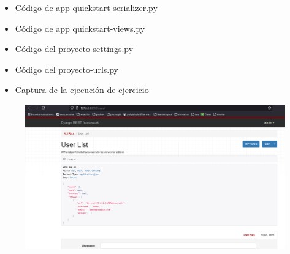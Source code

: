 \documentclass{article}
\begin{document}
	\begin{itemize}
		\item Código de app quickstart-serializer.py
	\end{itemize}
	
	\begin{itemize}
		\item Código de app quickstart-views.py
	\end{itemize}
	
	\begin{itemize}
		\item Código del proyecto-settings.py
	\end{itemize}
	
	\begin{itemize}
		\item Código del proyecto-urls.py
	\end{itemize}
	
	\begin{itemize}
		\item Captura de la ejecución de ejercicio 
	\end{itemize}
	\begin{figure}[H]
		\centering
		\includegraphics[width=1\textwidth,keepaspectratio]{pruebas/ejercicio.png}
	\end{figure}
	\clearpage
	
	
	
\end{document}
